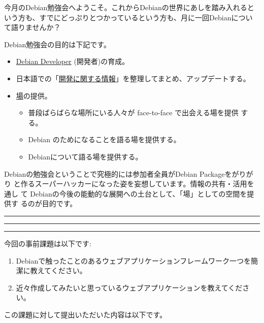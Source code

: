 \documentclass[mingoth,a4paper]{jsarticle}
\begin{document}

\begin{multicols}{2}
 

 今月のDebian勉強会へようこそ。これからDebianの世界にあしを踏み入れると
 いう方も、すでにどっぷりとつかっているという方も、月に一回Debianについ
 て語りませんか？

 Debian勉強会の目的は下記です。

 \begin{itemize}
 \item \underline{Debian Developer} (開発者)の育成。
 \item 日本語での「\underline{開発に関する情報}」を整理してまとめ、アップデートする。
 \item \underline{場}の提供。
 \begin{itemize}
  \item 普段ばらばらな場所にいる人々が face-to-face で出会える場を提供
	する。
  \item Debian のためになることを語る場を提供する。
  \item Debianについて語る場を提供する。
 \end{itemize}
 \end{itemize}		

 Debianの勉強会ということで究極的には参加者全員がDebian Packageをがりがり
 と作るスーパーハッカーになった姿を妄想しています。情報の共有・活用を通し
 て Debianの今後の能動的な展開への土台として、「場」としての空間を提供す
 るのが目的です。

\end{multicols}

\newpage

\begin{minipage}[b]{0.2\hsize}
 \colorbox{titleback}{}
\end{minipage}
\begin{minipage}[b]{0.8\hsize}
\hrule
\vspace{2mm}
\hrule
\begin{multicols}{2}
\tableofcontents
\end{multicols}
\vspace{2mm}
\hrule
\end{minipage}


今回の事前課題は以下です:
\begin{enumerate}
 \item Debianで触ったことのあるウェブアプリケーションフレームワーク一つを簡潔に教えてください。
 \item 近々作成してみたいと思っているウェブアプリケーションを教えてください。
\end{enumerate}
この課題に対して提出いただいた内容は以下です。
\begin{multicols}{2}
{\small
 
}
\end{multicols}
\end{document}
